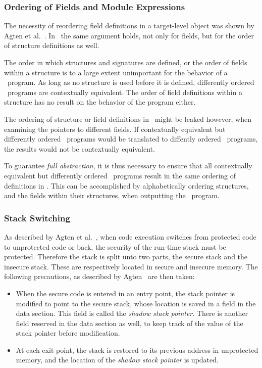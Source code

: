 \subsubsection{Ordering of Fields and Module Expressions}
The necessity of reordering field definitions in a target-level object was shown by Agten et al.~\cite{Agten:2012:SCM:2354412.2355247}.
In \MiniML\ the same argument holds, not only for fields, but for the order of structure definitions as well.

The order in which structures and signatures are defined, or the order of fields within a structure is to a large extent unimportant for the behavior of a \MiniML\ program.
As long as no structure is used before it is defined, differently ordered \MiniML\ programs are contextually equivalent.
The order of field definitions within a structure has no result on the behavior of the program either.

The ordering of structure or field definitions in \LLVMIR\ might be leaked however, when examining the pointers to different fields.
If contextually equivalent but differently ordered \MiniML\ programs would be translated to diffently ordered \LLVMIR\ programs, the results would not be contextually equivalent.

To guarantee \emph{full abstraction}, it is thus necessary to ensure that all contextually equivalent but differently ordered \MiniML\ programs result in the same ordering of definitions in \LLVMIR.
This can be accomplished by alphabetically ordering structures, and the fields within their structures, when outputting the \LLVMIR\ program.

\subsubsection{Stack Switching}
As described by Agten et al.~\cite{Agten:2012:SCM:2354412.2355247}, when code execution switches from protected code to unprotected code or back, the security of the run-time stack must be protected.
Therefore the stack is split unto two parts, the secure stack and the insecure stack.
These are respectively located in secure and insecure memory.
The following precautions, as described by Agten~\cite{Agten:2012:SCM:2354412.2355247} are then taken:
\begin{itemize}
\item When the secure code is entered in an entry point, the stack pointer is modified to point to the secure stack, whose location is saved in a field in the data section.
This field is called the \emph{shadow stack pointer}.
There is another field reserved in the data section as well, to keep track of the value of the stack pointer before modification.
\item At each exit point, the stack is restored to its previous
address in unprotected memory, and the location of the \emph{shadow stack pointer} is updated.
\end{itemize}

